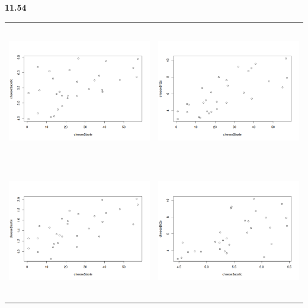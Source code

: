 \documentclass[12pt]{article}
\renewcommand\part[1]{\vspace{.10in}\textbf{#1}\par}
\begin{document}
\part{11.54} %
	\begin{center}
	\begin{tabular}{cc}
	\includegraphics[width=.5\textwidth, height=60mm, keepaspectratio]{images/1154/1154graph1.png} & \includegraphics[width=.7\textwidth, height=60mm, keepaspectratio]{images/1154/1154graph2.png}\\
	\includegraphics[width=.5\textwidth, height=60mm, keepaspectratio]{images/1154/1154graph3.png} & \includegraphics[width=.7\textwidth, height=60mm, keepaspectratio]{images/1154/1154graph4.png}\\

\end{tabular}
\end{center}
\end{document}
